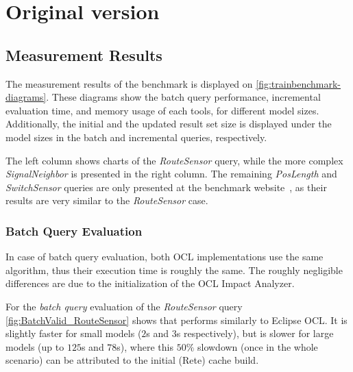 \section{Original version}


\subsection{Measurement Results}
\label{sec:results}

The measurement results of the benchmark is displayed on
\autoref{fig:trainbenchmark-diagrams}. These diagrams show the batch query
performance, incremental evaluation time, and memory usage of each tools, for
different model sizes. Additionally, the initial and the updated result set size
is displayed under the model sizes in the batch and incremental queries,
respectively.

The left column shows charts of the \emph{RouteSensor} query,
while the more complex \emph{SignalNeighbor} is presented in the right column.
The remaining \emph{PosLength} and \emph{SwitchSensor} queries are only presented
at the benchmark website~\cite{TBwebsite}, as their results are very similar to the
\emph{RouteSensor} case.

\subsubsection{Batch Query Evaluation}
In case of batch query evaluation, both OCL implementations use the same
algorithm, thus their execution time is roughly the same. The roughly negligible
differences are due to the initialization of the OCL Impact Analyzer.

For the \emph{batch query} evaluation of the \emph{RouteSensor} query
\autoref{fig:BatchValid_RouteSensor} shows that \incquery{} performs similarly
to Eclipse OCL. It is slightly faster for small models ($2$s and $3$s
respectively), but is slower for large models (up to $125$s and $78$s), where
this $50\%$ slowdown (once in the whole scenario) can be attributed to the
initial (Rete) cache build.


